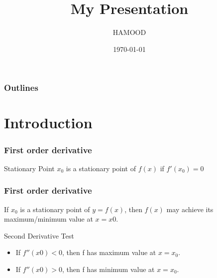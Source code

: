 \documentclass{beamer}
\date{\today}
\institute{UNNC}
\title{My Presentation}
\author{HAMOOD}
\begin{document}
\begin{frame} %
\maketitle
\end{frame}
\begin{frame} %
\frametitle{Outlines}
\tableofcontents
\end{frame}


\section{Introduction}
\begin{frame} %
\frametitle{First order derivative}
\begin{block}{Stationary Point}
$x_0$ is a stationary point of $f(x)$ if $f'(x_0) = 0$
\end{block}



\end{frame}
\begin{frame} %
\frametitle{First order derivative}

If $x_0$ is a stationary point of $y = f (x)$, then $f (x)$ may achieve its maximum/minimum value at $x = x0$.\\\pause
\begin{block}{Second Derivative Test}
\begin{itemize}
\item
If $f''(x0) < 0$, then f has maximum value at $x = x_0$.
\item
If $f''(x0) > 0$, then f has minimum value at $x = x_0$.
\end{itemize}
\end{block}


\end{frame}
\end{document}

